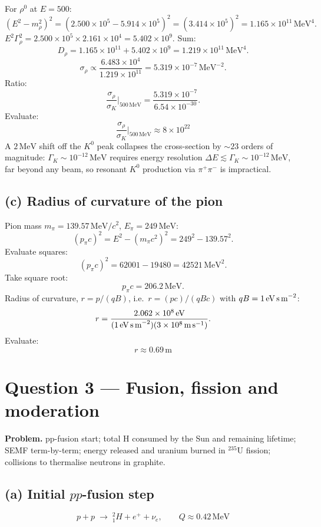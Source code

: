 \documentclass[11pt]{article}
\newcommand{\MeV}{\,\mathrm{MeV}}
\begin{document}
For $\rho^0$ at $E=500$:
\[
(E^2-m_\rho^2)^2 = (2.500\times 10^5 - 5.914\times 10^5)^2 = (3.414\times 10^5)^2 = 1.165\times 10^{11}\MeV^4.
\]
$E^2\Gamma_\rho^2 = 2.500\times 10^5\times 2.161\times 10^4 = 5.402\times 10^9$. Sum:
\[
D_\rho = 1.165\times 10^{11} + 5.402\times 10^9 = 1.219\times 10^{11}\MeV^4.
\]
\[
\sigma_\rho \propto \frac{6.483\times 10^4}{1.219\times 10^{11}} = 5.319\times 10^{-7}\MeV^{-2}.
\]
Ratio:
\[
\frac{\sigma_\rho}{\sigma_K}\bigg|_{500\MeV} = \frac{5.319\times 10^{-7}}{6.54\times 10^{-30}}.
\]
Evaluate:
\[
\boxed{\;\frac{\sigma_\rho}{\sigma_K}\bigg|_{500\MeV} \approx 8\times 10^{22}\;}
\]
A $2\MeV$ shift off the $K^0$ peak collapses the cross-section by $\sim 23$ orders of magnitude: $\Gamma_K\sim 10^{-12}\MeV$ requires energy resolution $\Delta E\lesssim \Gamma_K \sim 10^{-12}\MeV$, far beyond any beam, so resonant $K^0$ production via $\pi^+\pi^-$ is impractical.

\subsection*{(c) Radius of curvature of the pion}

Pion mass $m_\pi = 139.57\MeV/c^2$, $E_\pi=249\MeV$:
\[
(p_\pi c)^2 = E^2 - (m_\pi c^2)^2 = 249^2 - 139.57^2.
\]
Evaluate squares:
\[
(p_\pi c)^2 = 62001 - 19480 = 42521\MeV^2.
\]
Take square root:
\[
p_\pi c = 206.2\MeV.
\]
Radius of curvature, $r = p/(qB)$, i.e.\ $r = (pc)/(qBc)$ with $qB=1\,\text{eV\,s\,m}^{-2}$:
\[
r = \frac{2.062\times 10^{8}\,\text{eV}}{(1\,\text{eV\,s\,m}^{-2})(3\times 10^8\,\text{m\,s}^{-1})}.
\]
Evaluate:
\[
\boxed{\;r \approx 0.69\,\text{m}\;}
\]

\section*{Question 3 --- Fusion, fission and moderation}

\textbf{Problem.} pp-fusion start; total H consumed by the Sun and remaining lifetime; SEMF term-by-term; energy released and uranium burned in $^{235}$U fission; collisions to thermalise neutrons in graphite.

\subsection*{(a) Initial $pp$-fusion step}

\[
\boxed{\;p + p \;\longrightarrow\; {}^2_1\!H + e^+ + \nu_e,\qquad Q \approx 0.42\MeV\;}
\]
\end{document}
